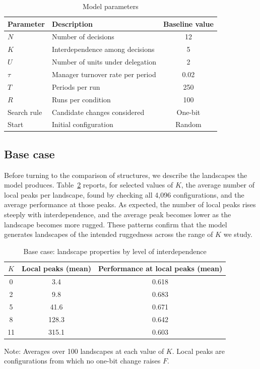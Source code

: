 \documentclass[11pt]{article}
\begin{document}
\begin{table}[h]
\centering
\caption{Model parameters}
\label{tab:params}
\begin{tabular}{llc}
\toprule
Parameter & Description & Baseline value \\
\midrule
$N$ & Number of decisions & 12 \\
$K$ & Interdependence among decisions & 5 \\
$U$ & Number of units under delegation & 2 \\
$\tau$ & Manager turnover rate per period & 0.02 \\
$T$ & Periods per run & 250 \\
$R$ & Runs per condition & 100 \\
Search rule & Candidate changes considered & One-bit \\
Start & Initial configuration & Random \\
\bottomrule
\end{tabular}
\end{table}

\subsection{Base case}

Before turning to the comparison of structures, we describe the landscapes the model produces. Table~\ref{tab:basecase} reports, for selected values of $K$, the average number of local peaks per landscape, found by checking all 4,096 configurations, and the average performance at those peaks. As expected, the number of local peaks rises steeply with interdependence, and the average peak becomes lower as the landscape becomes more rugged. These patterns confirm that the model generates landscapes of the intended ruggedness across the range of $K$ we study.

\begin{table}[h]
\centering
\caption{Base case: landscape properties by level of interdependence}
\label{tab:basecase}
\begin{tabular}{ccc}
\toprule
$K$ & Local peaks (mean) & Performance at local peaks (mean) \\
\midrule
0 & 3.4 & 0.618 \\
2 & 9.8 & 0.683 \\
5 & 41.6 & 0.671 \\
8 & 128.3 & 0.642 \\
11 & 315.1 & 0.603 \\
\bottomrule
\end{tabular}

\smallskip
\footnotesize Note: Averages over 100 landscapes at each value of $K$. Local peaks are configurations from which no one-bit change raises $F$.
\end{table}
\end{document}
